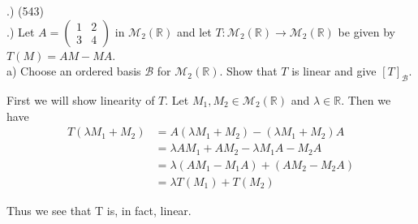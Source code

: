 \documentclass[a4paper, 11pt]{article}
\newcommand{\R}{\mathbb{R}}
\newenvironment{solution}{%
	\begin{list}{}{%
			\setlength{\topsep}{0pt}%
			\setlength{\leftmargin}{1.5cm}%
			\setlength{\rightmargin}{1.5cm}%
			\setlength{\listparindent}{\parindent}%
			\setlength{\itemindent}{\parindent}%
			\setlength{\parsep}{\parskip}%
		}%
		\item[]}{\end{list}}
\begin{document}
.) (543) \\

.) Let $A=\begin{pmatrix} 1 & 2 \\ 3 & 4 \end{pmatrix}$ in $\mathcal{M}_2(\R)$ and let $T:\mathcal{M}_2(\R)\to\mathcal{M}_2(\R)$ be given by $T(M)=AM-MA$. \\
\noindent a) Choose an ordered basis $\mathcal{B}$ for $\mathcal{M}_2(\R)$. Show that $T$ is linear and give $[T]_\mathcal{B}$. \\
\begin{solution}
  \noindent First we will show linearity of $T$. Let $M_1, M_2 \in \mathcal{M}_2(\R)$ and $\lambda\in\R$. Then we have
  \begin{align*}
    T(\lambda M_1 + M_2) &= A(\lambda M_1 + M_2) - (\lambda M_1 + M_2)A \\
    &= \lambda A M_1 + A M_2 - \lambda M_1 A - M_2 A \\
    &= \lambda(A M_1 - M_1 A) + (AM_2 - M_2 A) \\
    &= \lambda T(M_1) + T(M_2)
  \end{align*}

  \noindent Thus we see that T is, in fact, linear. \\


\end{solution}
\end{document}
